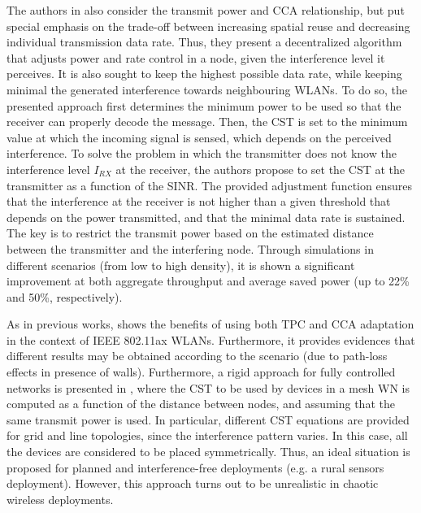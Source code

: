 \documentclass[12pt, a4paper,twoside]{tesi_upf}
\begin{document}
			The authors in \cite{kim2006improving} also consider the transmit power and CCA relationship, but put special emphasis on the trade-off between increasing spatial reuse and decreasing individual transmission data rate. Thus, they present a decentralized algorithm that adjusts power and rate control in a node, given the interference level it perceives. It is also sought to keep the highest possible data rate, while keeping minimal the generated interference towards neighbouring WLANs. To do so, the presented approach first determines the minimum power to be used so that the receiver can properly decode the message. Then, the CST is set to the minimum value at which the incoming signal is sensed, which depends on the perceived interference. To solve the problem in which the transmitter does not know the interference level $I_{RX}$ at the receiver, the authors propose to set the CST at the transmitter as a function of the SINR. The provided adjustment function ensures that the interference at the receiver is not higher than a given threshold that depends on the power transmitted, and that the minimal data rate is sustained. The key is to restrict the transmit power based on the estimated distance between the transmitter and the interfering node. Through simulations in different scenarios (from low to high density), it is shown a significant improvement at both aggregate throughput and average saved power (up to 22\% and 50\%, respectively). 
			
			As in previous works, \cite{oteri2015improved} shows the benefits of using both TPC and CCA adaptation in the context of IEEE 802.11ax WLANs. Furthermore, it provides evidences that different results may be obtained according to the scenario (due to path-loss effects in presence of walls). Furthermore, a rigid approach for fully controlled networks is presented in \cite{zhu2004leveraging}, where the CST to be used by devices in a mesh WN is computed as a function of the distance between nodes, and assuming that the same transmit power is used. In particular, different CST equations are provided for grid and line topologies, since the interference pattern varies. In this case, all the devices are considered to be placed symmetrically. Thus, an ideal situation is proposed for planned and interference-free deployments (e.g. a rural sensors deployment). However, this approach turns out to be unrealistic in chaotic wireless deployments.
			
\end{document}
